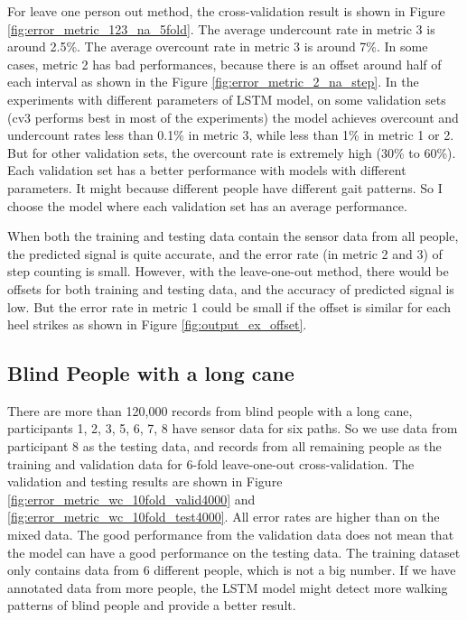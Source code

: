 \documentclass[11pt]{article}
\begin{document}
For leave one person out method, the cross-validation result is shown in Figure \ref{fig:error_metric_123_na_5fold}.
The average undercount rate in metric 3 is around 2.5\%. The average overcount rate in metric 3 is around 7\%.
In some cases, metric 2 has bad performances, because there is an offset around half of each interval as shown in the Figure \ref{fig:error_metric_2_na_step}. 
In the experiments with different parameters of LSTM model, on some validation sets (cv3 performs best in most of the experiments) the model achieves overcount and undercount rates less than 0.1\% in metric 3, while less than 1\% in metric 1 or 2. But for other validation sets, the overcount rate is extremely high (30\% to 60\%). Each validation set has a better performance with models with different parameters. It might because different people have different gait patterns. So I choose the model where each validation set has an average performance. 

When both the training and testing data contain the sensor data from all people, the predicted signal is quite accurate, and the error rate (in metric 2 and 3) of step counting is small. However, with the leave-one-out method, there would be offsets for both training and testing data, and the accuracy of predicted signal is low. But the error rate in metric 1 could be small if the offset is similar for each heel strikes as shown in Figure \ref{fig:output_ex_offset}. 

\subsection{Blind People with a long cane}
There are more than 120,000 records from blind people with a long cane, participants 1, 2, 3, 5, 6, 7, 8 have sensor data for six paths. So we use data from participant 8 as the testing data, and records from all remaining people as the training and validation data for 6-fold leave-one-out cross-validation. The validation and testing results are shown in Figure \ref{fig:error_metric_wc_10fold_valid4000} and \ref{fig:error_metric_wc_10fold_test4000}. All error rates are higher than on the mixed data. The good performance from the validation data does not mean that the model can have a good performance on the testing data.
The training dataset only contains data from 6 different people, which is not a big number. If we have annotated data from more people, the LSTM model might detect more walking patterns of blind people and provide a better result.
\end{document}
